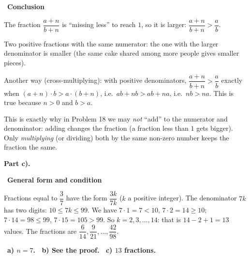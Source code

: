 \documentclass[11pt]{article}
\providecommand{\AnsWord}{Đáp số}
\newcommand{\ans}[1]{\par\smallskip{\bfseries\color{tmGreen!88!black}\AnsWord:}\ {\bfseries\color{AnsRed}#1}\par}
\newcommand{\step}[2]{\par\smallskip\noindent{\bfseries\color{tmBlue!85!black}\StepWord~#1.}\ {\bfseries #2}\par\nopagebreak}
\def\AnsWord{Answer}
\def\StepWord{Step}
\begin{document}
{\step{5}{Conclusion}
The fraction $\dfrac{a+n}{b+n}$ is ``missing less'' to reach $1$, so it is larger: $\dfrac{a+n}{b+n}>\dfrac ab$.

\begin{recallbox}Two positive fractions with the same numerator: the one with the larger denominator is smaller (the same cake shared among more people gives smaller pieces).\end{recallbox}

\begin{proofbox}Another way (cross-multiplying): with positive denominators, $\dfrac{a+n}{b+n}>\dfrac ab$ exactly when $(a+n)\cdot b>a\cdot(b+n)$, i.e.\ $ab+nb>ab+na$, i.e.\ $nb>na$. This is true because $n>0$ and $b>a$.\end{proofbox}

\begin{warnbox}This is exactly why in Problem 18 we may \emph{not} ``add'' to the numerator and denominator: adding changes the fraction (a fraction less than $1$ gets bigger). Only \emph{multiplying} (or dividing) both by the same non-zero number keeps the fraction the same.\end{warnbox}

\par\smallskip\textbf{Part c).}
\step{6}{General form and condition}
Fractions equal to $\dfrac37$ have the form $\dfrac{3k}{7k}$ ($k$ a positive integer). The denominator $7k$ has two digits: $10\le 7k\le 99$. We have $7\cdot 1=7<10$, $7\cdot 2=14\ge 10$; $7\cdot 14=98\le 99$, $7\cdot 15=105>99$. So $k=2,3,\dots,14$: that is $14-2+1=13$ values.
The fractions are $\dfrac{6}{14},\dfrac{9}{21},\dots,\dfrac{42}{98}$.

\ans{a) $n=7$. \ b) See the proof. \ c) $13$ fractions.}
}
\end{document}
